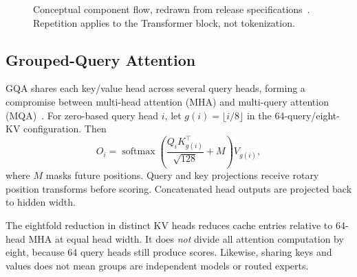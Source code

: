 \documentclass[conference]{IEEEtran}
\begin{document}
\begin{figure}[t]
\centering\small
{}
\caption{Conceptual component flow, redrawn from release specifications~\cite{card,config}. Repetition applies to the Transformer block, not tokenization.}
\end{figure}

\subsection{Grouped-Query Attention}
GQA shares each key/value head across several query heads, forming a compromise between multi-head attention (MHA) and multi-query attention (MQA)~\cite{gqa}. For zero-based query head $i$, let $g(i)=\lfloor i/8\rfloor$ in the 64-query/eight-KV configuration. Then
\begin{equation}
O_i=\operatorname{softmax}\!\left(
\frac{Q_iK_{g(i)}^\top}{\sqrt{128}}+M\right)V_{g(i)},
\end{equation}
where $M$ masks future positions. Query and key projections receive rotary position transforms before scoring. Concatenated head outputs are projected back to hidden width.

The eightfold reduction in distinct KV heads reduces cache entries relative to 64-head MHA at equal head width. It does \emph{not} divide all attention computation by eight, because 64 query heads still produce scores. Likewise, sharing keys and values does not mean groups are independent models or routed experts.
\end{document}
